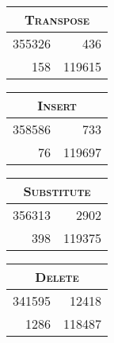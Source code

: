 \begin{center}
    \begin{table}
    \begin{tabular}{rr}
    \multicolumn{2}{c}{\textsc{Transpose}} \\
    \hline
    355326 &  436 \\
    158 &     119615 \\
    \hline
    \end{tabular}
    \end{table} 
        
    \begin{table}
    \begin{tabular}{rr}
    \multicolumn{2}{c}{\textsc{Insert}} \\
    \hline
    358586 &        733 \\
    76 &     119697 \\
    \hline
    \end{tabular}
    \end{table}
    
    \begin{table}
    \begin{tabular}{rr}
    \multicolumn{2}{c}{\textsc{Substitute}} \\
    \hline
    356313 &       2902 \\
    398 &     119375 \\
    \hline
    \end{tabular}
    \end{table}
    
    \begin{table}
    \begin{tabular}{rr}
    \multicolumn{2}{c}{\textsc{Delete}} \\
    \hline
    341595 &      12418 \\
    1286 &     118487 \\
    \hline
    \end{tabular}
    \end{table}
\end{center}